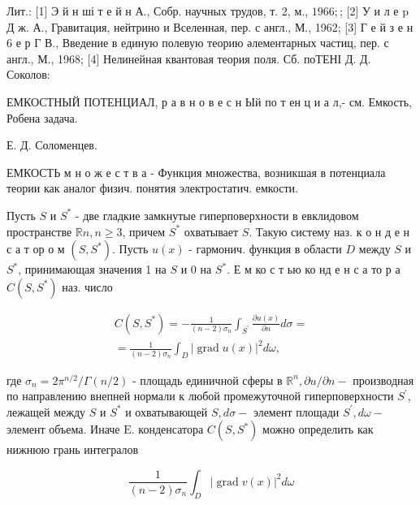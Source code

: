 \documentclass[10pt]{article}
\begin{document}
Лит.: [1] Э й н ші т е й н А., Собр. научных трудов, т. 2, м., $1966 ;$; [2] У и л е p Д ж. А., Гравитация, нейтрино и Вселенная, пер. с англ., М., 1962; [3] Г е й з е н 6 е р Г В., Введение в единую полевую теорию әлементарных частиц, пер. с англ., М., 1968; [4] Нелинейная квантовая теория поля. Сб. поТЕНІ Д. Д. Соколов:



ЕМКОСТНЫЙ ПОТЕНЦИАЛ, р а в н о в е с н Ый по т ен ц и а л,- см. Емкость, Робена задача.



Е. Д. Соломенцев.



ЕМКОСТЬ м н о ж е с т в а - Функция множества, возникшая в потенциала теории как аналог физич. понятия электростатич. емкости.



Пусть $S$ и $S^{*}$ - две гладкие замкнутые гиперповерхности в евклидовом пространстве $\mathbb{R} n, n \geqslant 3$, причем $S^{*}$ охватывает $S$. Такую систему наз. к о н д е н с а т ор о м $\left(S, S^{*}\right)$. Пусть $u(x)$ - гармонич. функция в области $D$ между $S$ и $S^{*}$, принимающая значения 1 на $S$ и 0 на $S^{*}$. Е м ко с т ью ко нд е н с а то р а $C\left(S, S^{*}\right)$ наз. число



\[

\begin{gathered}

C\left(S, S^{*}\right)=-\frac{1}{(n-2) \sigma_{n}} \int_{S^{\prime}} \frac{\partial u(x)}{\partial n} d \sigma= \\

=\frac{1}{(n-2) \sigma_{n}} \int_{D}|\operatorname{grad} u(x)|^{2} d \omega,

\end{gathered}

\]



где $\sigma_{n}=2 \pi^{n / 2} / \Gamma(n / 2)$ - площадь единичной сферы в $\mathbb{R}^{n}, \partial u / \partial n-$ производная по направлению внепней нормали к любой промежуточной гиперповерхности $S^{\prime}$, лежащей между $S$ и $S^{*}$ и охватывающей $S, d \sigma-$ элемент площади $S^{\prime}, d \omega-$ элемент объема. Иначе $\mathrm{E}$. конденсатора $C\left(S, S^{*}\right)$ можно определить как нижнюю грань интегралов



\[

\frac{1}{(n-2) \sigma_{n}} \int_{D}|\operatorname{grad} v(x)|^{2} d \omega

\]
\end{document}
